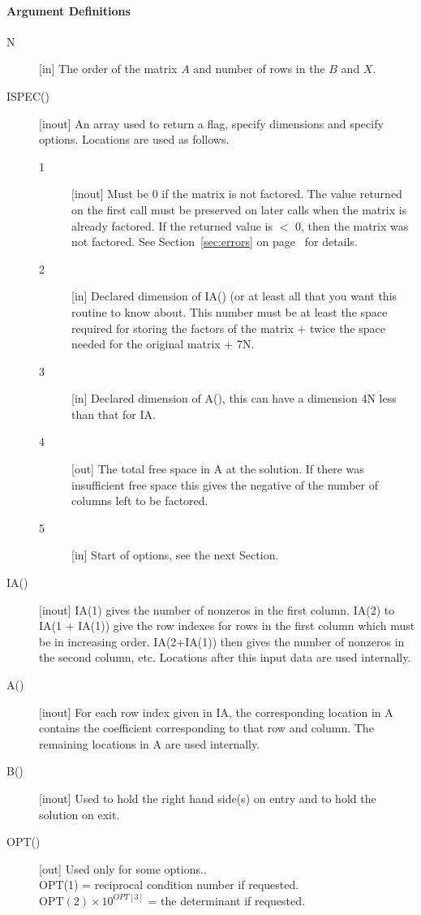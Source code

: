 \documentclass[twoside]{MATH77}
\begin{document}
\paragraph{Argument Definitions}

\begin{description}

\item[N] [in] The order of the matrix $A$ and number of rows in the
  $B$ and $X$.

\item[ISPEC()] [inout] An array used to return a flag, specify
  dimensions and specify options.  Locations are used as follows.
  \begin{description}
  \item[1] [inout] Must be 0 if the matrix is not factored.  The value
    returned on the first call must be preserved on later calls when
    the matrix is already factored.  If the returned value is $<$ 0,
    then the matrix was not factored.  See Section~\ref{sec:errors} on
    page~\pageref{sec:errors} for details.
  \item[2] [in] Declared dimension of IA() (or at least all that you
    want this routine to know about.  This number must be at least the
    space required for storing the factors of the matrix + twice the
    space needed for the original matrix + 7N.
  \item[3] [in] Declared dimension of A(), this can have a dimension
    4N less than that for IA.
  \item[4] [out]  The total free space in A at the solution.  If there
    was insufficient free space this gives the negative of the number
    of columns left to be factored.
  \item[5] [in] Start of options, see the next Section.
  \end{description}

\item[IA()] [inout] IA(1) gives the number of nonzeros in the first
  column.  IA(2) to IA(1 + IA(1)) give the row indexes for rows in the
  first column which must be in increasing order.  IA(2+IA(1)) then
  gives the number of nonzeros in the second column, etc.  Locations
  after this input data are used internally.

\item[A()] [inout] For each row index given in IA, the corresponding
  location in A contains the coefficient corresponding to that row and
  column.  The remaining locations in A are used internally.

\item[B()] [inout] Used to hold the right hand side(s) on entry and to
  hold the solution on exit.

\item[OPT()] [out] Used only for some options..\\
  OPT(1) = reciprocal condition number if requested.\\
  OPT$(2) \times 10^{OPT[3]}$ = the determinant if requested.
\end{description}
\end{document}
